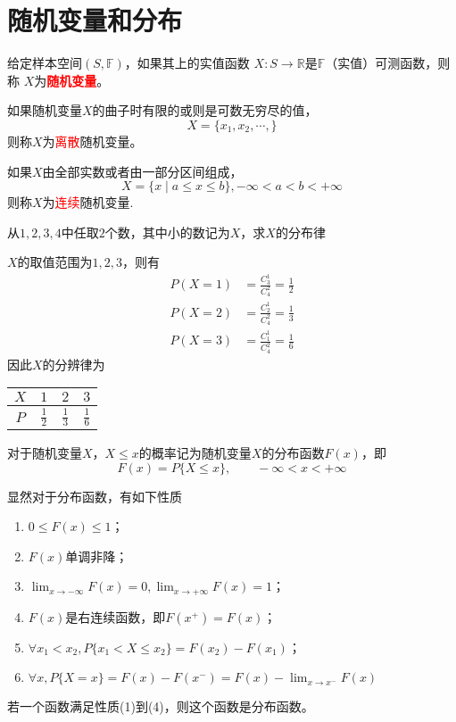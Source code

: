 \section{随机变量和分布}
给定样本空间$(S,\mathbb{F})$，如果其上的实值函数 $X:S\to \mathbb {R}$是$\mathbb{F}$（实值）可测函数，则称
$X$为\textcolor{red}{\textbf{\textsf{随机变量}}}。

如果随机变量$X$的曲子时有限的或则是可数无穷尽的值，
\[ X=\{ x_1,x_2,\cdots, \} \]
则称$X$为\textcolor{red}{离散}随机变量。

如果$X$由全部实数或者由一部分区间组成，
\[ X=\{ x\mid a\leq x\leq b \}, -\infty <a<b< +\infty\]
则称$X$为\textcolor{red}{连续}随机变量.


\begin{example}
    从$1,2,3,4$中任取$2$个数，其中小的数记为$X$，求$X$的分布律
\end{example}
\begin{solution}
    $X$的取值范围为${1,2,3}$，则有
    \begin{align*}
        P(X=1) & = \frac{C_3^1}{C_4^2} = \frac{1}{2} \\
        P(X=2) & = \frac{C_2^1}{C_4^2} = \frac{1}{3} \\
        P(X=3) & = \frac{C_1^1}{C_4^2} = \frac{1}{6}
    \end{align*}
    因此$X$的分辨律为
    \begin{center}
        \begin{tabular}{c|ccc}
            $X$ & $1$           & $2$           & $3$           \\ \hline
            $P$ & $\frac{1}{2}$ & $\frac{1}{3}$ & $\frac{1}{6}$
        \end{tabular}
    \end{center}
\end{solution}

\begin{definition}
    对于随机变量$X$，$X\leq x$的概率记为随机变量$X$的分布函数$F(x)$，即
    \[ F(x) = P\{X \leq x\},\qquad -\infty < x < +\infty \]
\end{definition}
显然对于分布函数，有如下性质
\begin{enumerate}[(1)]
    \item $ 0\leq F(x) \leq 1 $；
    \item $ F(x) $单调非降；
    \item $ \lim_{x\to -\infty} F(x) = 0, \lim_{x\to +\infty}F(x) = 1 $；
    \item $F(x)$是右连续函数，即$F(x^+) = F(x)$；
    \item $\forall x_1<x_2, P\{x_1<X\leq x_2\} = F(x_2) - F(x_1)$；
    \item $\forall x, P\{X=x\} = F(x)-F(x^-) = F(x) - \lim_{x\to x^-} F(x)$
\end{enumerate}
若一个函数满足性质(1)到(4)，则这个函数是分布函数。

